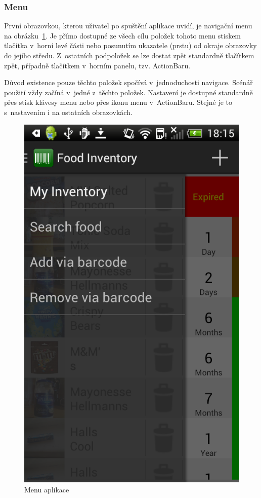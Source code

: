 \documentclass[thesis=B,czech]{FITthesis}[2013/10/20]
\begin{document}
\clearpage

\subsubsection{Menu}

První obrazovkou, kterou uživatel po spuštění aplikace uvidí, je navigační menu na obrázku~\ref{fig:AppMenu}. Je přímo dostupné ze všech cílu položek tohoto menu stiskem tlačítka v~horní levé části nebo posunutím ukazatele (prstu) od okraje obrazovky do jejího středu. Z~ostatních podpoložek se lze dostat zpět standardně tlačítkem zpět, případně tlačítkem v~horním panelu, tzv. ActionBaru.

Důvod existence pouze těchto položek spočívá v~jednoduchosti navigace. Scénář použití vždy začíná v~jedné z~těchto položek. Nastavení je dostupné standardně přes stisk klávesy menu nebo přes ikonu menu v~ActionBaru. Stejné je to s~nastavením i na ostatních obrazovkách.

\begin{figure}[H]
  \centering
  \includegraphics[scale=0.4]{screenshots/app_menu.png}
  \caption{Menu aplikace}
  \label{fig:AppMenu}
\end{figure}
\end{document}
